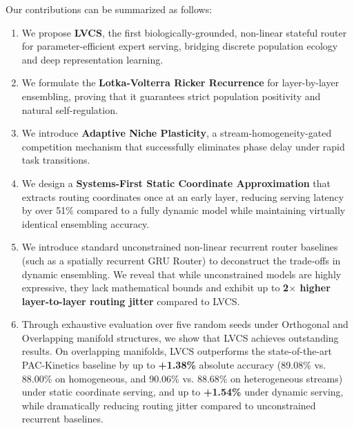 Our contributions can be summarized as follows:
\begin{enumerate}
    \item We propose \textbf{LVCS}, the first biologically-grounded, non-linear stateful router for parameter-efficient expert serving, bridging discrete population ecology and deep representation learning.
    \item We formulate the \textbf{Lotka-Volterra Ricker Recurrence} for layer-by-layer ensembling, proving that it guarantees strict population positivity and natural self-regulation.
    \item We introduce \textbf{Adaptive Niche Plasticity}, a stream-homogeneity-gated competition mechanism that successfully eliminates phase delay under rapid task transitions.
    \item We design a \textbf{Systems-First Static Coordinate Approximation} that extracts routing coordinates once at an early layer, reducing serving latency by over 51\% compared to a fully dynamic model while maintaining virtually identical ensembling accuracy.
    \item We introduce standard unconstrained non-linear recurrent router baselines (such as a spatially recurrent GRU Router) to deconstruct the trade-offs in dynamic ensembling. We reveal that while unconstrained models are highly expressive, they lack mathematical bounds and exhibit up to \textbf{2$\times$ higher layer-to-layer routing jitter} compared to LVCS.
    \item Through exhaustive evaluation over five random seeds under Orthogonal and Overlapping manifold structures, we show that LVCS achieves outstanding results. On overlapping manifolds, LVCS outperforms the state-of-the-art PAC-Kinetics baseline by up to \textbf{+1.38\%} absolute accuracy (89.08\% vs. 88.00\% on homogeneous, and 90.06\% vs. 88.68\% on heterogeneous streams) under static coordinate serving, and up to \textbf{+1.54\%} under dynamic serving, while dramatically reducing routing jitter compared to unconstrained recurrent baselines.
\end{enumerate}
